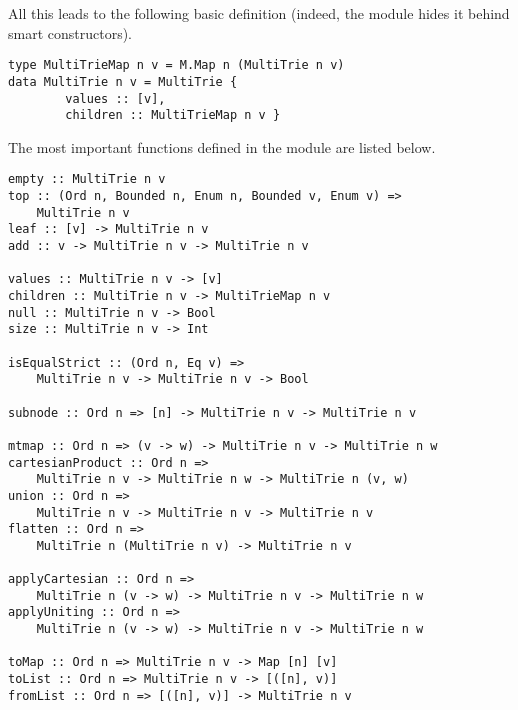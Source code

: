 \documentclass{article}
\theoremstyle{definition}
\begin{document}
All this leads to the following basic definition (indeed, the module hides it
behind smart constructors).

\begin{lstlisting}
type MultiTrieMap n v = M.Map n (MultiTrie n v) 
data MultiTrie n v = MultiTrie {
        values :: [v],
        children :: MultiTrieMap n v }
\end{lstlisting}

The most important functions defined in the module are listed below.

\begin{lstlisting}
empty :: MultiTrie n v
top :: (Ord n, Bounded n, Enum n, Bounded v, Enum v) =>
    MultiTrie n v
leaf :: [v] -> MultiTrie n v
add :: v -> MultiTrie n v -> MultiTrie n v

values :: MultiTrie n v -> [v]
children :: MultiTrie n v -> MultiTrieMap n v
null :: MultiTrie n v -> Bool
size :: MultiTrie n v -> Int

isEqualStrict :: (Ord n, Eq v) =>
    MultiTrie n v -> MultiTrie n v -> Bool

subnode :: Ord n => [n] -> MultiTrie n v -> MultiTrie n v

mtmap :: Ord n => (v -> w) -> MultiTrie n v -> MultiTrie n w
cartesianProduct :: Ord n =>
    MultiTrie n v -> MultiTrie n w -> MultiTrie n (v, w)
union :: Ord n =>
    MultiTrie n v -> MultiTrie n v -> MultiTrie n v
flatten :: Ord n =>
    MultiTrie n (MultiTrie n v) -> MultiTrie n v

applyCartesian :: Ord n =>
    MultiTrie n (v -> w) -> MultiTrie n v -> MultiTrie n w
applyUniting :: Ord n =>
    MultiTrie n (v -> w) -> MultiTrie n v -> MultiTrie n w

toMap :: Ord n => MultiTrie n v -> Map [n] [v]
toList :: Ord n => MultiTrie n v -> [([n], v)]
fromList :: Ord n => [([n], v)] -> MultiTrie n v
\end{lstlisting}
\end{document}
